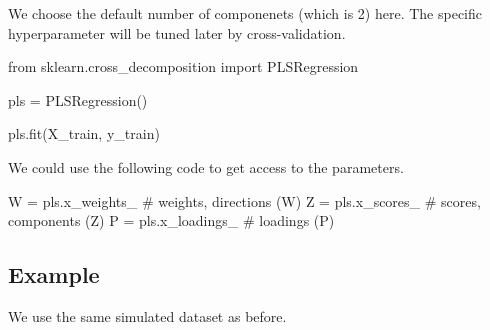 \documentclass[
  letterpaper,
  DIV=11,
  numbers=noendperiod]{scrreprt}
\newenvironment{Shaded}{\begin{snugshade}}{\end{snugshade}}
\newcommand{\CommentTok}[1]{\textcolor[rgb]{0.37,0.37,0.37}{#1}}
\newcommand{\ImportTok}[1]{\textcolor[rgb]{0.00,0.46,0.62}{#1}}
\newcommand{\NormalTok}[1]{\textcolor[rgb]{0.00,0.23,0.31}{#1}}
\newcommand{\OperatorTok}[1]{\textcolor[rgb]{0.37,0.37,0.37}{#1}}
\theoremstyle{definition}
\theoremstyle{definition}
\theoremstyle{plain}
\theoremstyle{plain}
\theoremstyle{remark}
\begin{document}
We choose the default number of componenets (which is 2) here. The
specific hyperparameter will be tuned later by cross-validation.

\begin{Shaded}
\begin{Highlighting}[]
\ImportTok{from}\NormalTok{ sklearn.cross\_decomposition }\ImportTok{import}\NormalTok{ PLSRegression}

\NormalTok{pls }\OperatorTok{=}\NormalTok{ PLSRegression()}

\NormalTok{pls.fit(X\_train, y\_train)}
\end{Highlighting}
\end{Shaded}

We could use the following code to get access to the parameters.

\begin{Shaded}
\begin{Highlighting}[]
\NormalTok{W }\OperatorTok{=}\NormalTok{ pls.x\_weights\_    }\CommentTok{\# weights, directions (W)}
\NormalTok{Z }\OperatorTok{=}\NormalTok{ pls.x\_scores\_     }\CommentTok{\# scores, components (Z)}
\NormalTok{P }\OperatorTok{=}\NormalTok{ pls.x\_loadings\_   }\CommentTok{\# loadings (P)}
\end{Highlighting}
\end{Shaded}

\subsection{Example}\label{example}

We use the same simulated dataset as before.
\end{document}
